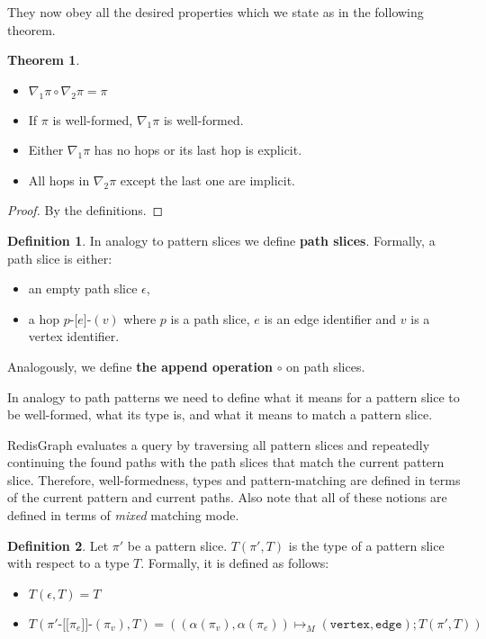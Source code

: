 \documentclass[14pt]{constructor-thesis}
\theoremstyle{definition}
\newtheorem{theorem}{Theorem}
\newtheorem{definition}{Definition}
\newcommand{\pathhop}[3]{#1 \texttt{-[} #2 \texttt{]-} (#3)}
\newcommand{\patternhop}[3]{#1 \texttt{-[[} #2 \texttt{]]-} (#3)}
\begin{document}
They now obey all the desired properties which we state as in the following theorem.

\begin{theorem} $ $
  \begin{itemize}
    \item $\nabla_1 \pi \circ \nabla_2 \pi = \pi$
    \item If $\pi$ is well-formed, $\nabla_1 \pi$ is well-formed.
    \item Either $\nabla_1 \pi$ has no hops or its last hop is explicit.
    \item All hops in $\nabla_2 \pi$ except the last one are implicit.
  \end{itemize}
\end{theorem}
\begin{proof}
  By the definitions.
\end{proof}

\begin{definition}
  In analogy to pattern slices we define \textbf{path slices}. Formally, a path slice is either:
  \begin{itemize}
    \item an empty path slice $\epsilon$,
    \item a hop $\pathhop{p}{e}{v}$ where $p$ is a path slice, $e$ is an edge identifier and $v$ is a vertex identifier.
  \end{itemize}

  Analogously, we define \textbf{the append operation} $\circ$ on path slices.
\end{definition}

In analogy to path patterns we need to define what it means for a pattern slice to be well-formed, what its type is, and what it means to match a pattern slice.

RedisGraph evaluates a query by traversing all pattern slices and repeatedly continuing the found paths with the path slices that match the current pattern slice. Therefore, well-formedness, types and pattern-matching are defined in terms of the current pattern and current paths. Also note that all of these notions are defined in terms of \textit{mixed} matching mode.

\begin{definition}
  Let $\pi'$ be a pattern slice. $T(\pi', T)$ is the type of a pattern slice with respect to a type $T$. Formally, it is defined as follows:
  \begin{itemize}
    \item $T(\epsilon, T) = T$
    \item $T(\patternhop{\pi'}{\pi_e}{\pi_v}, T) = ((\alpha(\pi_v), \alpha(\pi_e)) \mapsto_M (\texttt{vertex}, \texttt{edge}); T(\pi', T))$
  \end{itemize}
\end{definition}
\end{document}
